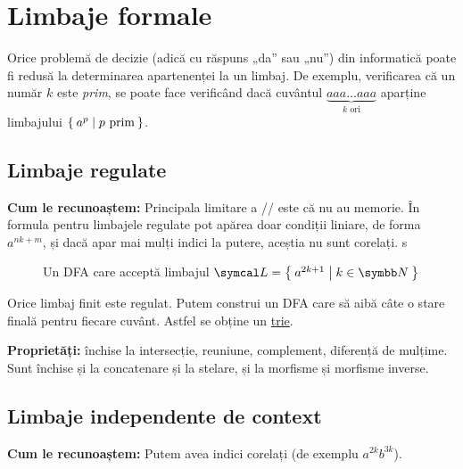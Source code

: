 \section*{Limbaje formale}

Orice problemă de decizie (adică cu răspuns „da” sau „nu”) din informatică poate fi redusă la determinarea apartenenței la un limbaj.
De exemplu, verificarea că un număr \(k\) este \emph{prim}, se poate face verificând dacă cuvântul \(\underbrace{aaa \dots aaa}_{k \text{ ori}}\) aparține limbajului \(\Set{ a^p | p \text{ prim} }\).

\subsection*{Limbaje regulate}

\textbf{Cum le recunoaștem:} Principala limitare a \dfa/\nfa/\lnfa{} este că nu au memorie. În formula pentru limbajele regulate pot apărea doar condiții liniare, de forma \(a^{nk + m}\), și dacă apar mai mulți indici la putere, aceștia nu sunt corelați.
s
\begin{figure}[H]
    \centering
    \caption*{Un DFA care acceptă limbajul \(\lang = \Set{a^{2k + 1} | k \in \naturals}\)}
\end{figure}

\begin{observation}
    Orice limbaj finit este regulat. Putem construi un DFA care să aibă câte o stare finală pentru fiecare cuvânt. Astfel se obține un \href{https://en.wikipedia.org/wiki/Trie}{trie}.
\end{observation}

\textbf{Proprietăți:} închise la intersecție, reuniune, complement, diferență de mulțime. Sunt închise și la concatenare și la stelare, și la morfisme și morfisme inverse.

\subsection*{Limbaje independente de context}

\textbf{Cum le recunoaștem:} Putem avea indici corelați (de exemplu \(a^{2k} b^{3k}\)).


